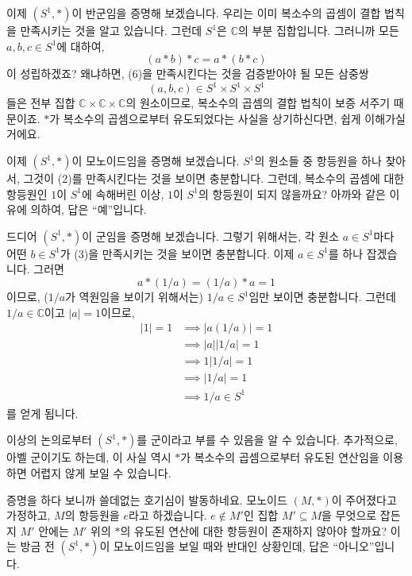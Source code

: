 \documentclass[12pt]{paper}
\begin{document}
  이제 $\left( S^1 , * \right)$이 반군임을 증명해 보겠습니다.
  우리는 이미 복소수의 곱셈이 결합 법칙을 만족시키는 것을 알고 있습니다.
  그런데 $S^1$은 $\mathbb{C}$의 부분 집합입니다.
  그러니까 모든 $a , b , c \in S^1$에 대하여, 
  \begin{equation*}
    (a * b) * c = a * (b * c) \tag{6}
  \end{equation*}
  이 성립하겠죠?
  왜냐하면, (6)을 만족시킨다는 것을 검증받아야 될 모든 삼중쌍 $$ \left( a , b , c \right) \in S^1 \times S^1 \times S^1 $$들은
  전부 집합 $\mathbb{C} \times \mathbb{C} \times \mathbb{C}$의 원소이므로,
  복소수의 곱셈의 결합 법칙이 보증 서주기 때문이죠.
  $*$가 복소수의 곱셈으로부터 유도되었다는 사실을 상기하신다면,
  쉽게 이해가실 거에요.

  이제 $\left( S^1 , * \right)$이 모노이드임을 증명해 보겠습니다.
  $S^1$의 원소들 중 항등원을 하나 찾아서, 그것이 (2)를 만족시킨다는 것을 보이면 충분합니다.
  그런데, 복소수의 곱셈에 대한 항등원인 $1$이 $S^1$에 속해버린 이상, $1$이 $S^1$의 항등원이 되지 않을까요?
  아까와 같은 이유에 의하여, 답은 ``예''입니다.

  드디어 $\left( S^1 , * \right)$이 군임을 증명해 보겠습니다.
  그렇기 위해서는, 각 원소 $a \in S^1$마다 어떤 $b \in S^1$가 (3)을 만족시키는 것을 보이면 충분합니다.
  이제 $a \in S^1$를 하나 잡겠습니다.
  그러면 $$ a * \left( 1 / a \right) = \left( 1 / a \right) * a = 1 $$이므로,
  ($1 / a$가 역원임을 보이기 위해서는) $1 / a \in S^1$임만 보이면 충분합니다.
  그런데 $1 / a \in \mathbb{C}$이고 $\left| a \right| = 1$이므로,
  \begin{align*}
    \left| 1 \right| = 1 
    & \implies \left| a \left( 1 / a \right) \right| = 1 \\
    & \implies \left| a \right| \left| 1 / a \right| = 1 \\
    & \implies 1 \left| 1 / a \right| = 1 \\
    & \implies \left| 1 / a \right| = 1 \\
    & \implies 1 / a \in S^1
  \end{align*}
  를 얻게 됩니다.

  이상의 논의로부터 $\left( S^1 , * \right)$를 군이라고 부를 수 있음을 알 수 있습니다.
  추가적으로, 아벨 군이기도 하는데,
  이 사실 역시 $*$가 복소수의 곱셈으로부터 유도된 연산임을 이용하면 어렵지 않게 보일 수 있습니다.

  증명을 하다 보니까 쓸데없는 호기심이 발동하네요.
  모노이드 $\left( M , * \right)$이 주어졌다고 가정하고, $M$의 항등원을 $e$라고 하겠습니다.
  $e \notin M'$인 집합 $M' \subseteq M$을 무엇으로 잡든지 $M'$ 안에는 $M'$ 위의 $*$의 유도된 연산에 대한 항등원이 존재하지 않아야 할까요?
  이는 방금 전 $\left( S^1 , * \right)$이 모노이드임을 보일 때와 반대인 상황인데, 답은 ``아니오''입니다.
  
\end{document}
